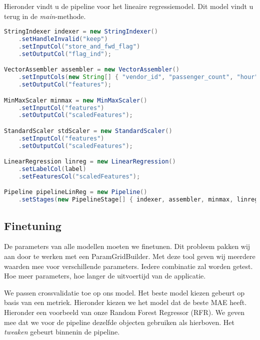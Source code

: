 \documentclass[a4paper,10pt,twoside]{report}
\begin{document}
Hieronder vindt u de pipeline voor het lineaire regressiemodel. Dit model vindt u terug in de \textit{main}-methode.

\begin{lstlisting}[language=Java]
StringIndexer indexer = new StringIndexer()
	.setHandleInvalid("keep")
	.setInputCol("store_and_fwd_flag")
	.setOutputCol("flag_ind");

VectorAssembler assembler = new VectorAssembler()
	.setInputCols(new String[] { "vendor_id", "passenger_count", "hour", "day", "flag_ind", "distance" })
	.setOutputCol("features");

MinMaxScaler minmax = new MinMaxScaler()
	.setInputCol("features")
	.setOutputCol("scaledFeatures");

StandardScaler stdScaler = new StandardScaler()
	.setInputCol("features")
	.setOutputCol("scaledFeatures");

LinearRegression linreg = new LinearRegression()
	.setLabelCol(label)
	.setFeaturesCol("scaledFeatures");

Pipeline pipelineLinReg = new Pipeline()
	.setStages(new PipelineStage[] { indexer, assembler, minmax, linreg });
\end{lstlisting}

\newpage

\subsection*{Finetuning}

De parameters van alle modellen moeten we finetunen. Dit probleem pakken wij aan door te werken met een ParamGridBuilder. Met deze tool geven wij meerdere waarden mee voor verschillende parameters. Iedere combinatie zal worden getest. Hoe meer parameters, hoe langer de uitvoertijd van de applicatie. 

We passen crossvalidatie toe op ons model. Het beste model kiezen gebeurt op basis van een metriek. Hieronder kiezen we het model dat de beste MAE heeft. Hieronder een voorbeeld van onze Random Forest Regressor (RFR). We geven mee dat we voor de pipeline dezelfde objecten gebruiken als hierboven. Het \textit{tweaken} gebeurt binnenin de pipeline.
\end{document}
